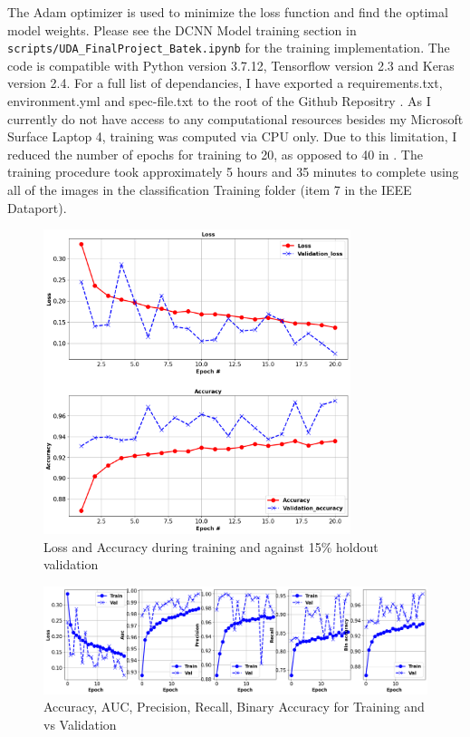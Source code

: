 \documentclass[a4paper,11pt]{article} %
\begin{document}
The Adam optimizer is used to minimize the loss function and find the optimal model weights. Please see the DCNN Model training section
in \verb!scripts/UDA_FinalProject_Batek.ipynb! for the training implementation. The code is compatible with
Python version 3.7.12, Tensorflow version 2.3 and Keras version 2.4. For a full list of dependancies, I have exported
a requirements.txt, environment.yml and spec-file.txt to the root of the Github Repositry \cite{Batek_Unstructured_Data_Analysis}.
As I currently do not have access to any computational resources besides my Microsoft Surface Laptop 4, training was computed via
CPU only. Due to this limitation, I reduced the number of epochs for training to 20, as opposed to 40 in \cite{FLAME_dataset}. The training
procedure took approximately 5 hours and 35 minutes to complete using all of the images in the classification Training folder (item 7 in the IEEE Dataport). 

\begin{figure}[h]
    \centering
    \includegraphics[width=0.8\textwidth]{../figures/training_loss_accuracy.png}
    \caption{Loss and Accuracy during training and against 15\% holdout validation}
    \label{fig:train_loss_accuracy}
\end{figure}

\begin{figure}[h]
    \centering
    \includegraphics[width=\textwidth]{../figures/training_metrics.png}
    \caption{Accuracy, AUC, Precision, Recall, Binary Accuracy for Training and vs Validation}
    \label{fig:train_metrics}
\end{figure}
\end{document}
